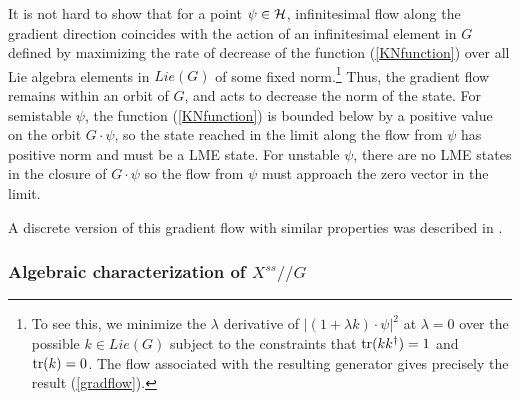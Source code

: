 \documentclass[12pt]{article}
\theoremstyle{definition}
\newcommand{\tr}{{\rm tr}}
\newcommand{\GITquot}{/\!/}
\begin{document}
It is not hard to show that for a point $\psi \in {\cal H}$, infinitesimal flow along the gradient direction coincides with the action of an infinitesimal element in $G$ defined by maximizing the rate of decrease of the function (\ref{KNfunction}) over all Lie algebra elements in $Lie(G)$ of some fixed norm.\footnote{To see this, we minimize the $\lambda$ derivative of $|(1 + \lambda k) \cdot \psi|^2$ at $\lambda = 0$ over the possible $k \in Lie(G)$ subject to the constraints that $\tr(k k^\dagger) = 1$ and $\tr(k) = 0$. The flow associated with the resulting generator gives precisely the result (\ref{gradflow}).}  Thus, the gradient flow remains within an orbit of $G$, and acts to decrease the norm of the state. For semistable $\psi$, the function (\ref{KNfunction}) is bounded below by a positive value on the orbit $G \cdot \psi$, so the state reached in the limit along the flow from $\psi$ has positive norm and must be a LME state. For unstable $\psi$, there are no LME states in the closure of $G \cdot \psi$ so the flow from $\psi$ must approach the zero vector in the limit.

A discrete version of this gradient flow with similar properties was described in \cite{VDD}.

\subsubsection*{Algebraic characterization of $X^{ss}\GITquot G$}
\end{document}
